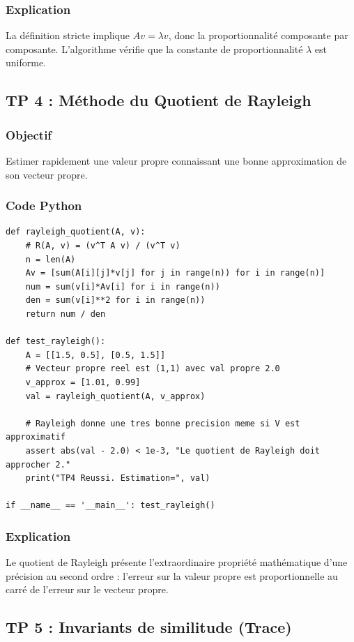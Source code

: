 \documentclass[11pt,a4paper]{article}
\begin{document}
\subsubsection*{Explication}
La définition stricte implique $Av = \lambda v$, donc la proportionnalité composante par composante. L'algorithme vérifie que la constante de proportionnalité $\lambda$ est uniforme.


\subsection*{TP 4 : Méthode du Quotient de Rayleigh}

\subsubsection*{Objectif}
Estimer rapidement une valeur propre connaissant une bonne approximation de son vecteur propre.

\subsubsection*{Code Python}
\begin{lstlisting}
def rayleigh_quotient(A, v):
    # R(A, v) = (v^T A v) / (v^T v)
    n = len(A)
    Av = [sum(A[i][j]*v[j] for j in range(n)) for i in range(n)]
    num = sum(v[i]*Av[i] for i in range(n))
    den = sum(v[i]**2 for i in range(n))
    return num / den

def test_rayleigh():
    A = [[1.5, 0.5], [0.5, 1.5]]
    # Vecteur propre reel est (1,1) avec val propre 2.0
    v_approx = [1.01, 0.99]
    val = rayleigh_quotient(A, v_approx)

    # Rayleigh donne une tres bonne precision meme si V est approximatif
    assert abs(val - 2.0) < 1e-3, "Le quotient de Rayleigh doit approcher 2."
    print("TP4 Reussi. Estimation=", val)

if __name__ == '__main__': test_rayleigh()
\end{lstlisting}
\subsubsection*{Explication}
Le quotient de Rayleigh présente l'extraordinaire propriété mathématique d'une précision au second ordre : l'erreur sur la valeur propre est proportionnelle au carré de l'erreur sur le vecteur propre.


\subsection*{TP 5 : Invariants de similitude (Trace)}
\end{document}
